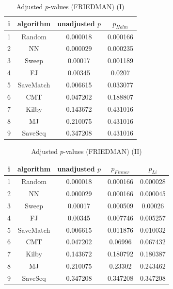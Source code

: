\documentclass[a4paper,10pt]{article}
\begin{document}
\begin{landscape}
\begin{table}[!htp]
\centering\small
\begin{tabular}{cccc}
i&algorithm&unadjusted $p$&$p_{Holm}$\\
\hline1&Random&0.000018&0.000166\\2&NN&0.000029&0.000235\\3&Sweep&0.00017&0.001189\\4&FJ&0.00345&0.0207\\5&SaveMatch&0.006615&0.033077\\6&CMT&0.047202&0.188807\\7&Kilby&0.143672&0.431016\\8&MJ&0.210075&0.431016\\9&SaveSeq&0.347208&0.431016\\\hline
\end{tabular}
\caption{Adjusted $p$-values (FRIEDMAN) (I)}
\end{table}
\begin{table}[!htp]
\centering\small
\begin{tabular}{ccccc}
i&algorithm&unadjusted $p$&$p_{Finner}$&$p_{Li}$\\
\hline1&Random&0.000018&0.000166&0.000028\\2&NN&0.000029&0.000166&0.000045\\3&Sweep&0.00017&0.000509&0.00026\\4&FJ&0.00345&0.007746&0.005257\\5&SaveMatch&0.006615&0.011876&0.010032\\6&CMT&0.047202&0.06996&0.067432\\7&Kilby&0.143672&0.180792&0.180387\\8&MJ&0.210075&0.23302&0.243462\\9&SaveSeq&0.347208&0.347208&0.347208\\\hline
\end{tabular}
\caption{Adjusted $p$-values (FRIEDMAN) (II)}
\end{table}

\newpage
\end{landscape}
\end{document}
